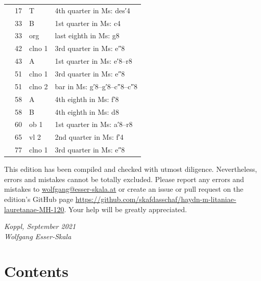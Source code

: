 \documentclass[parskip=full]{scrreprt}
\newif\iftemplate\templatetrue
\begin{document}
\begin{longtable}{lll L{10cm}}
    & 17 & T       & 4th quarter in Ms: des′4 \\
    & 33 & B       & 1st quarter in Ms: c4 \\
    & 33 & org     & last eighth in Ms: g8 \\
    & 42 & clno 1  & 3rd quarter in Ms: e″8 \\
    & 43 & A       & 1st quarter in Ms: e′8–r8 \\
    & 51 & clno 1  & 3rd quarter in Ms: e″8 \\
    & 51 & clno 2  & bar in Ms: g′8–g′8–c″8–c″8 \\
    & 58 & A       & 4th eighth in Ms: f′8 \\
    & 58 & B       & 4th eighth in Ms: d8 \\
    & 60 & ob 1    & 1st quarter in Ms: a′8–r8 \\
    & 65 & vl 2    & 2nd quarter in Ms: f′4 \\
    & 77 & clno 1  & 3rd quarter in Ms: e″8 \\
  \bottomrule
\end{longtable}


This edition has been compiled and checked with utmost diligence. Nevertheless, errors and mistakes cannot be totally excluded. Please report any errors and mistakes to \url{wolfgang@esser-skala.at} or create an issue or pull request on the edition’s GitHub page \url{https://github.com/skafdasschaf/haydn-m-litaniae-lauretanae-MH-120}. Your help will be greatly appreciated.

\bigskip
\textit{Koppl, September 2021\\
Wolfgang Esser-Skala}

\cleardoublepage
\chapter*{Contents}


\cleardoublepage
\fi

\iftemplate

\fi
\end{document}
